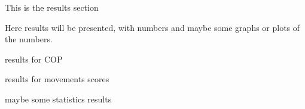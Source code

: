 
This is the results section

Here results will be presented, with numbers and maybe some graphs or plots of the numbers.



results for COP 

results for movements scores

maybe some statistics results